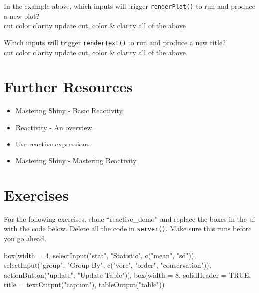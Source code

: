 \documentclass[
  oneside]{book}
\newenvironment{Shaded}{\begin{snugshade}}{\end{snugshade}}
\newcommand{\AttributeTok}[1]{\textcolor[rgb]{0.77,0.63,0.00}{#1}}
\newcommand{\ConstantTok}[1]{\textcolor[rgb]{0.00,0.00,0.00}{#1}}
\newcommand{\DecValTok}[1]{\textcolor[rgb]{0.00,0.00,0.81}{#1}}
\newcommand{\FunctionTok}[1]{\textcolor[rgb]{0.00,0.00,0.00}{#1}}
\newcommand{\NormalTok}[1]{#1}
\newcommand{\StringTok}[1]{\textcolor[rgb]{0.31,0.60,0.02}{#1}}
\providecommand{\tightlist}{%
  \setlength{\itemsep}{0pt}\setlength{\parskip}{0pt}}
\begin{document}
In the example above, which inputs will trigger \texttt{renderPlot}\texttt{()} to run and produce a new plot?\\
cut color clarity update cut, color \& clarity all of the above

Which inputs will trigger \texttt{renderText}\texttt{()} to run and produce a new title?\\
cut color clarity update cut, color \& clarity all of the above

\hypertarget{resources-reactive}{%
\section{Further Resources}\label{resources-reactive}}

\begin{itemize}
\tightlist
\item
  \href{https://mastering-shiny.org/basic-reactivity.html}{Mastering Shiny - Basic Reactivity}
\item
  \href{https://shiny.rstudio.com/articles/reactivity-overview.html}{Reactivity - An overview}
\item
  \href{https://shiny.rstudio.com/tutorial/written-tutorial/lesson6/}{Use reactive expressions}
\item
  \href{https://mastering-shiny.org/reactivity-intro.html}{Mastering Shiny - Mastering Reactivity}
\end{itemize}

\hypertarget{exercises-reactive}{%
\section{Exercises}\label{exercises-reactive}}

For the following exercises, clone ``reactive\_demo'' and replace the boxes in the ui with the code below. Delete all the code in \texttt{server}\texttt{()}. Make sure this runs before you go ahead.

\begin{Shaded}
\begin{Highlighting}[]
\FunctionTok{box}\NormalTok{(}\AttributeTok{width =} \DecValTok{4}\NormalTok{,}
    \FunctionTok{selectInput}\NormalTok{(}\StringTok{"stat"}\NormalTok{, }\StringTok{"Statistic"}\NormalTok{, }\FunctionTok{c}\NormalTok{(}\StringTok{"mean"}\NormalTok{, }\StringTok{"sd"}\NormalTok{)),}
    \FunctionTok{selectInput}\NormalTok{(}\StringTok{"group"}\NormalTok{, }\StringTok{"Group By"}\NormalTok{, }\FunctionTok{c}\NormalTok{(}\StringTok{"vore"}\NormalTok{, }\StringTok{"order"}\NormalTok{, }\StringTok{"conservation"}\NormalTok{)),}
    \FunctionTok{actionButton}\NormalTok{(}\StringTok{"update"}\NormalTok{, }\StringTok{"Update Table"}\NormalTok{)),}
\FunctionTok{box}\NormalTok{(}\AttributeTok{width =} \DecValTok{8}\NormalTok{,}
    \AttributeTok{solidHeader =} \ConstantTok{TRUE}\NormalTok{,}
    \AttributeTok{title =} \FunctionTok{textOutput}\NormalTok{(}\StringTok{"caption"}\NormalTok{),}
    \FunctionTok{tableOutput}\NormalTok{(}\StringTok{"table"}\NormalTok{))}
\end{Highlighting}
\end{Shaded}
\end{document}
